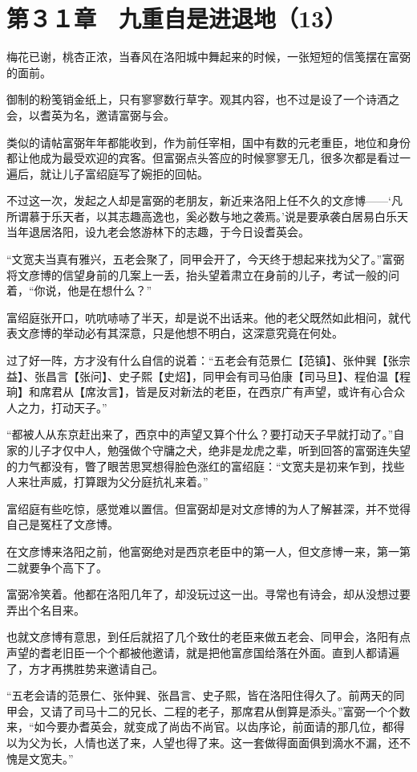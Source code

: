 \section{第３１章　九重自是进退地（13）}

梅花已谢，桃杏正浓，当春风在洛阳城中舞起来的时候，一张短短的信笺摆在富弼的面前。

御制的粉笺销金纸上，只有寥寥数行草字。观其内容，也不过是设了一个诗酒之会，以耆英为名，邀请富弼与会。

类似的请帖富弼年年都能收到，作为前任宰相，国中有数的元老重臣，地位和身份都让他成为最受欢迎的宾客。但富弼点头答应的时候寥寥无几，很多次都是看过一遍后，就让儿子富绍庭写了婉拒的回帖。

不过这一次，发起之人却是富弼的老朋友，新近来洛阳上任不久的文彦博——‘凡所谓慕于乐天者，以其志趣高逸也，奚必数与地之袭焉。’说是要承袭白居易白乐天当年退居洛阳，设九老会悠游林下的志趣，于今日设耆英会。

“文宽夫当真有雅兴，五老会聚了，同甲会开了，今天终于想起来找为父了。”富弼将文彦博的信望身前的几案上一丢，抬头望着肃立在身前的儿子，考试一般的问着，“你说，他是在想什么？”

富绍庭张开口，吭吭哧哧了半天，却是说不出话来。他的老父既然如此相问，就代表文彦博的举动必有其深意，只是他想不明白，这深意究竟在何处。

过了好一阵，方才没有什么自信的说着：“五老会有范景仁【范镇】、张仲巽【张宗益】、张昌言【张问】、史子熙【史炤】，同甲会有司马伯康【司马旦】、程伯温【程珦】和席君从【席汝言】，皆是反对新法的老臣，在西京广有声望，或许有心合众人之力，打动天子。”

“都被人从东京赶出来了，西京中的声望又算个什么？要打动天子早就打动了。”自家的儿子才仅中人，勉强做个守牗之犬，绝非是龙虎之辈，听到回答的富弼连失望的力气都没有，瞥了眼苦思冥想得脸色涨红的富绍庭：“文宽夫是初来乍到，找些人来壮声威，打算跟为父分庭抗礼来着。”

富绍庭有些吃惊，感觉难以置信。但富弼却是对文彦博的为人了解甚深，并不觉得自己是冤枉了文彦博。

在文彦博来洛阳之前，他富弼绝对是西京老臣中的第一人，但文彦博一来，第一第二就要争个高下了。

富弼冷笑着。他都在洛阳几年了，却没玩过这一出。寻常也有诗会，却从没想过要弄出个名目来。

也就文彦博有意思，到任后就招了几个致仕的老臣来做五老会、同甲会，洛阳有点声望的耆老旧臣一个个都被他邀请，就是把他富彦国给落在外面。直到人都请遍了，方才再携胜势来邀请自己。

“五老会请的范景仁、张仲巽、张昌言、史子熙，皆在洛阳住得久了。前两天的同甲会，又请了司马十二的兄长、二程的老子，那席君从倒算是添头。”富弼一个个数来，“如今要办耆英会，就变成了尚齿不尚官。以齿序论，前面请的那几位，都得以为父为长，人情也送了来，人望也得了来。这一套做得面面俱到滴水不漏，还不愧是文宽夫。”

